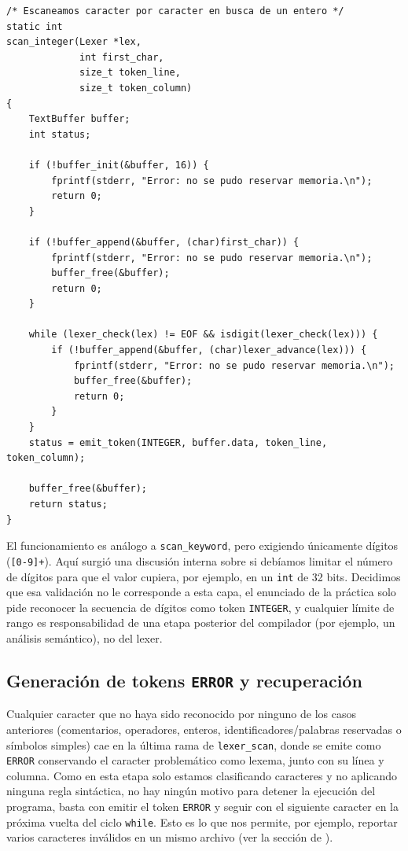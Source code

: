 \documentclass[12pt,letterpaper]{article}
\begin{document}
\begin{lstlisting}[style=modernc, caption={Función \texttt{scan\_integer}.}]
/* Escaneamos caracter por caracter en busca de un entero */
static int
scan_integer(Lexer *lex,
             int first_char,
             size_t token_line,
             size_t token_column)
{
    TextBuffer buffer;
    int status;

    if (!buffer_init(&buffer, 16)) {
        fprintf(stderr, "Error: no se pudo reservar memoria.\n");
        return 0;
    }
    
    if (!buffer_append(&buffer, (char)first_char)) {
        fprintf(stderr, "Error: no se pudo reservar memoria.\n");
        buffer_free(&buffer);
        return 0;
    }
    
    while (lexer_check(lex) != EOF && isdigit(lexer_check(lex))) {
        if (!buffer_append(&buffer, (char)lexer_advance(lex))) {
            fprintf(stderr, "Error: no se pudo reservar memoria.\n");
            buffer_free(&buffer);
            return 0;
        }
    }
    status = emit_token(INTEGER, buffer.data, token_line, token_column);
    
    buffer_free(&buffer);
    return status;
}
\end{lstlisting}

\bigskip

El funcionamiento es análogo a \texttt{scan\_keyword}, pero exigiendo únicamente dígitos
(\texttt{[0-9]+}). Aquí surgió una discusión interna sobre si debíamos limitar el número de dígitos para que
el valor cupiera, por ejemplo, en un \texttt{int} de 32 bits. Decidimos que esa validación no le corresponde a
esta capa, el enunciado de la práctica solo pide reconocer la secuencia de dígitos como token
\texttt{INTEGER}, y cualquier límite de rango es responsabilidad de una etapa posterior del compilador (por
ejemplo, un análisis semántico), no del lexer.

\subsection*{Generación de tokens \texttt{ERROR} y recuperación}

Cualquier caracter que no haya sido reconocido por ninguno de los casos anteriores (comentarios, operadores,
enteros, identificadores/palabras reservadas o símbolos simples) cae en la última rama de
\texttt{lexer\_scan}, donde se emite como \texttt{ERROR} conservando el caracter problemático como lexema,
junto con su línea y columna. Como en esta etapa solo estamos clasificando caracteres y no aplicando ninguna
regla sintáctica, no hay ningún motivo para detener la ejecución del programa, basta con emitir el token
\texttt{ERROR} y seguir con el siguiente caracter en la próxima vuelta del ciclo \texttt{while}. Esto es lo que
nos permite, por ejemplo, reportar varios caracteres inválidos en un mismo archivo (ver la sección de
).
\end{document}
